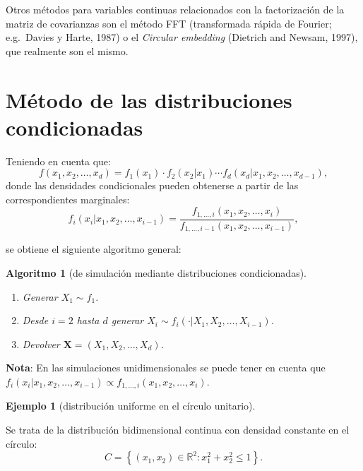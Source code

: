 \documentclass[
]{book}
\theoremstyle{break}
\newtheorem{conjecture}{Algoritmo}[chapter]
\theoremstyle{definition}
\theoremstyle{definition}
\newtheorem{example}{Ejemplo}[chapter]
\theoremstyle{definition}
\theoremstyle{definition}
\theoremstyle{remark}
\begin{document}
Otros métodos para variables continuas relacionados con la factorización de la matriz de covarianzas son el método FFT (transformada rápida de Fourier; e.g.~Davies y Harte, 1987) o el \emph{Circular embedding} (Dietrich and Newsam, 1997), que realmente son el mismo.

\hypertarget{distrcond}{%
\section{Método de las distribuciones condicionadas}\label{distrcond}}

Teniendo en cuenta que:
\[f\left( x_1,x_2,\ldots,x_d\right)  =f_1\left( x_1\right)  \cdot
f_2\left( x_2|x_1\right)  \cdots f_d\left( x_d|x_1,x_2,\ldots,x_{d-1}\right),\]
donde las densidades condicionales pueden obtenerse a partir de las
correspondientes marginales:
\[f_i\left( x_i|x_1,x_2,\ldots,x_{i-1}\right)  =\frac{f_{1,\ldots
,i}\left( x_1,x_2,\ldots,x_i\right)  }{f_{1,\ldots,i-1}\left(
x_1,x_2,\ldots,x_{i-1}\right)},\]

se obtiene el siguiente algoritmo general:

\begin{conjecture}[de simulación mediante distribuciones condicionadas]
\protect\hypertarget{cnj:mult-distrcond}{}{\label{cnj:mult-distrcond} {} }

\begin{enumerate}
\def\labelenumi{\arabic{enumi}.}
\item
  Generar \(X_1 \sim f_1\).
\item
  Desde \(i=2\) hasta \(d\) generar
  \(X_i \sim f_i\left( \cdot|X_1,X_2,\ldots,X_{i-1}\right)\).
\item
  Devolver \(\mathbf{X} =\left( X_1,X_2,\ldots,X_d\right)\).
\end{enumerate}
\end{conjecture}

\textbf{Nota}: En las simulaciones unidimensionales se puede tener en cuenta que
\(f_i\left( x_i|x_1,x_2,\ldots,x_{i-1}\right) \propto f_{1,\ldots,i}\left( x_1,x_2,\ldots,x_i\right)\).

\begin{example}[distribución uniforme en el círculo unitario]
\protect\hypertarget{exm:unnamed-chunk-8}{}{\label{exm:unnamed-chunk-8} {} }
\end{example}

Se trata de la distribución bidimensional continua con densidad
constante en el círculo:
\[C = \left\{ \left( x_1, x_2 \right)  \in \mathbb{R}^2 : x_1^2 + x_2^2 \leq 1 \right\}.\]
\end{document}
